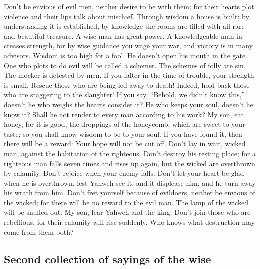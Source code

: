 \begin{paracol}{2}
\begin{otherlanguage}{english}
 Don't be envious of evil men, neither desire to be with
them;  for their hearts plot violence and their lips talk
about mischief.  Through wisdom a house is built; by
understanding it is established;  by knowledge the rooms
are filled with all rare and beautiful treasure.  A wise
man has great power. A knowledgeable man increases strength,
 for by wise guidance you wage your war, and victory is in
many advisors.  Wisdom is too high for a fool. He doesn't
open his mouth in the gate.  One who plots to do evil will
be called a schemer.  The schemes of folly are sin. The
mocker is detested by men.  If you falter in the time of
trouble, your strength is small.  Rescue those who are
being led away to death! Indeed, hold back those who are staggering to
the slaughter!  If you say, ``Behold, we didn't know
this,'' doesn't he who weighs the hearts consider it? He who keeps your
soul, doesn't he know it? Shall he not render to every man according to
his work?  My son, eat honey, for it is good, the
droppings of the honeycomb, which are sweet to your taste;
 so you shall know wisdom to be to your soul. If you have
found it, then there will be a reward: Your hope will not be cut off.
 Don't lay in wait, wicked man, against the habitation of
the righteous. Don't destroy his resting place;  for a
righteous man falls seven times and rises up again, but the wicked are
overthrown by calamity.  Don't rejoice when your enemy
falls. Don't let your heart be glad when he is overthrown,
 lest Yahweh see it, and it displease him, and he turn
away his wrath from him.  Don't fret yourself because of
evildoers, neither be envious of the wicked;  for there
will be no reward to the evil man. The lamp of the wicked will be
snuffed out.  My son, fear Yahweh and the king. Don't
join those who are rebellious,  for their calamity will
rise suddenly. Who knows what destruction may come from them both?

\hypertarget{second-collection-of-sayings-of-the-wise}{%
\subsection{Second collection of sayings of the
wise}\label{second-collection-of-sayings-of-the-wise}}


\end{otherlanguage}
\end{paracol}
